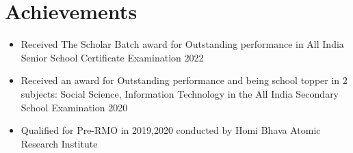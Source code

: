 \documentclass[letterpaper,11pt]{article}
\makeatletter
\newcommand{\resumeItem}[1]{
  \item\small{
    {#1 \vspace{-2pt}}
  }
}
\newcommand{\resumeProjectHeading}[2]{
    \item
    \begin{tabular*}{0.97\textwidth}{l@{\extracolsep{\fill}}r}
      \small#1 & #2 \\
    \end{tabular*}\vspace{-7pt}
}
\newcommand{\resumeSubHeadingListStart}{\begin{itemize}[leftmargin=0.15in, label={}]}
\newcommand{\resumeSubHeadingListEnd}{\end{itemize}}
\newcommand{\resumeItemListStart}{\begin{itemize}}
\newcommand{\resumeItemListEnd}{\end{itemize}\vspace{-5pt}}
\makeatother
\begin{document}
\section{Achievements}
          \resumeItemListStart
        \resumeItem{ Received The Scholar Batch award for Outstanding performance in All India Senior School Certificate Examination 2022 }
        \resumeItem{Received an award for Outstanding performance and being school topper in 2 subjects: Social Science, Information Technology  in the All India Secondary School Examination 2020 }
        \resumeItem{Qualified for Pre-RMO in 2019,2020 conducted by Homi Bhava Atomic Research Institute}
          \resumeItemListEnd      
\end{document}
